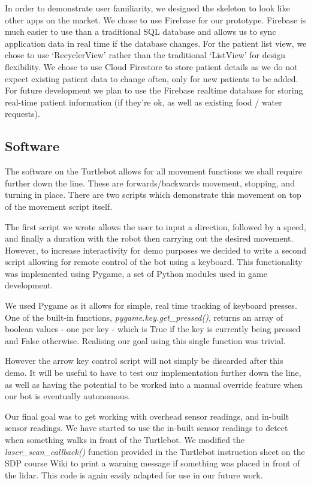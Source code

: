 \documentclass{article}
\begin{document}
In order to demonstrate user familiarity, we designed the skeleton to look like other apps on the market. We chose to use Firebase for our prototype. Firebase is much easier to use than a traditional SQL database and allows us to sync application data in real time if the database changes. For the patient list view, we chose to use `RecyclerView' rather than the traditional `ListView' for design flexibility. We chose to use Cloud Firestore to store patient details as we do not expect existing patient data to change often, only for new patients to be added. For future development we plan to use the Firebase realtime database for storing real-time patient information (if they're ok, as well as existing food / water requests).

\subsection{Software}

The software on the Turtlebot allows for all movement functions we shall require further down the line. These are forwards/backwards movement, stopping, and turning in place. There are two scripts which demonstrate this movement on top of the movement script itself.

The first script we wrote allows the user to input a direction, followed by a speed, and finally a duration with the robot then carrying out the desired movement. However, to increase interactivity for demo purposes we decided to write a second script allowing for remote control of the bot using a keyboard. This functionality was implemented using Pygame, a set of Python modules used in game development.

We used Pygame as it allows for simple, real time tracking of keyboard presses. One of the built-in functions, {\it pygame.key.get\_pressed()}, returns an array of boolean values - one per key - which is True if the key is currently being pressed and False otherwise. Realising our goal using this single function was trivial.

However the arrow key control script will not simply be discarded after this demo. It will be useful to have to test our implementation further down the line, as well as having the potential to be worked into a manual override feature when our bot is eventually autonomous.

Our final goal was to get working with overhead sensor readings, and in-built sensor readings. We have started to use the in-built sensor readings to detect when something walks in front of the Turtlebot. We modified the {\it laser\_scan\_callback()} function provided in the Turtlebot instruction sheet on the SDP course Wiki to print a warning message if something was placed in front of the lidar. This code is again easily adapted for use in our future work.
\end{document}
